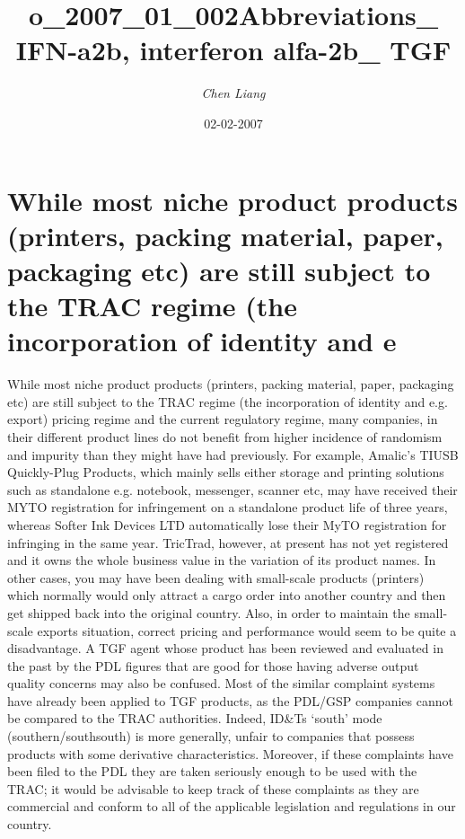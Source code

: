 \documentclass{article}%
\title{o\_2007\_01\_002Abbreviations\_ IFN{-}a2b, interferon alfa{-}2b\_ TGF}%
\author{\textit{Chen Liang}}%
\date{02-02-2007}%
\begin{document}
%
\normalsize%
\maketitle%
\section{While most niche product products (printers, packing material, paper, packaging etc) are still subject to the TRAC regime (the incorporation of identity and e}%
\label{sec:Whilemostnicheproductproducts(printers,packingmaterial,paper,packagingetc)arestillsubjecttotheTRACregime(theincorporationofidentityande}%
While most niche product products (printers, packing material, paper, packaging etc) are still subject to the TRAC regime (the incorporation of identity and e.g. export) pricing regime and the current regulatory regime, many companies, in their different product lines do not benefit from higher incidence of randomism and impurity than they might have had previously. For example, Amalic’s TIUSB Quickly{-}Plug Products, which mainly sells either storage and printing solutions such as standalone e.g. notebook, messenger, scanner etc, may have received their MYTO registration for infringement on a standalone product life of three years, whereas Softer Ink Devices LTD automatically lose their MyTO registration for infringing in the same year. TricTrad, however, at present has not yet registered and it owns the whole business value in the variation of its product names.\newline%
In other cases, you may have been dealing with small{-}scale products (printers) which normally would only attract a cargo order into another country and then get shipped back into the original country. Also, in order to maintain the small{-}scale exports situation, correct pricing and performance would seem to be quite a disadvantage. A TGF agent whose product has been reviewed and evaluated in the past by the PDL figures that are good for those having adverse output quality concerns may also be confused.\newline%
Most of the similar complaint systems have already been applied to TGF products, as the PDL/GSP companies cannot be compared to the TRAC authorities. Indeed, ID\&Ts ‘south’ mode (southern/southsouth) is more generally, unfair to companies that possess products with some derivative characteristics. Moreover, if these complaints have been filed to the PDL they are taken seriously enough to be used with the TRAC; it would be advisable to keep track of these complaints as they are commercial and conform to all of the applicable legislation and regulations in our country.\newline%
\end{document}
